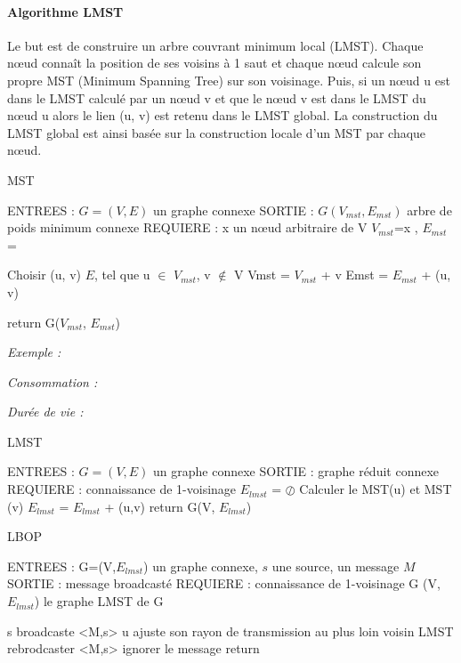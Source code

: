 \paragraph{Algorithme LMST}
Le but est de construire un arbre couvrant minimum local (LMST). Chaque nœud connaît la position de ses voisins à 1 saut et chaque nœud calcule son propre MST (Minimum Spanning Tree) sur son voisinage. Puis, si un nœud u est dans le LMST calculé par un nœud v et que le nœud v est dans le LMST du nœud u alors le lien (u, v) est retenu dans le LMST global. La construction du LMST global est ainsi basée sur la construction locale d’un MST par chaque nœud.

\begin{algorithm}[H]
\caption{MST}
\label{alg MST}
\begin{algorithmic}
\STATE ENTREES : $G=(V,E)$ un graphe connexe
\STATE SORTIE : $G(V_{mst}, E_{mst})$ arbre de poids minimum connexe
\STATE REQUIERE : x un nœud arbitraire de V
\STATE $V_{mst}$=x , $E_{mst}$ = {}

\REPEAT 
		\STATE Choisir (u, v)  $E$, tel que u $\in$ $V_{mst}$, v $\notin$ V
		\STATE Vmst = $V_{mst}$ + {v}
		\STATE Emst = $E_{mst}$ + (u, v)

\STATE return G($V_{mst}$, $E_{mst}$)

\end{algorithmic}
\end{algorithm}

\emph{Exemple :} 

\emph{Consommation :} 

\emph{Durée de vie :} 

\begin{algorithm}[H]
\caption{LMST}
\label{alg LMST}
\begin{algorithmic}
\STATE ENTREES : $G=(V,E)$ un graphe connexe
\STATE SORTIE : graphe réduit connexe
\STATE REQUIERE : connaissance de 1-voisinage
\STATE $E_{lmst}$ = $\oslash$
		\STATE Calculer le MST(u) et MST (v)
				\STATE $E_{lmst}$ = $E_{lmst}$ + (u,v)				
				\ENDIF
	\ENDFOR
\STATE return G(V, $E_{lmst}$)	

\end{algorithmic}
\end{algorithm}


\begin{algorithm}[H]
\caption{LBOP}
\label{alg LBOP}
\begin{algorithmic}
\STATE ENTREES : G=(V,$E_{lmst}$) un graphe connexe, $s$ une source, un message $M$
\STATE SORTIE : message broadcasté
\STATE REQUIERE : connaissance de 1-voisinage
\STATE G (V,$E_{lmst}$) le graphe LMST de G

\STATE s broadcaste <M,s>
\STATE u ajuste son rayon de transmission au plus loin voisin LMST
	\STATE 	rebrodcaster <M,s>
	\ELSE 
	\STATE ignorer le message
	\ENDIF
\ENDFOR
\STATE return

\end{algorithmic}
\end{algorithm}

